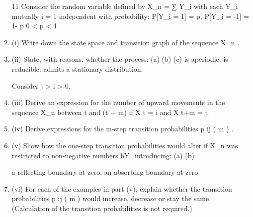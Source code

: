 \documentclass[a4paper,12pt]{article}
\begin{document}
\begin{enumerate}


11
Consider the random variable defined by X_n =
∑ Y_i with each Y_i mutually
i = 1
independent with probability:
P[Y_i = 1] = p, P[Y_i = -1] = 1- p
0 < p < 1
\item (i) Write down the state space and transition graph of the sequence X_n .
\item (ii) State, with reasons, whether the process:
(a)
(b)
(c)
is aperiodic.
is reducible.
admits a stationary distribution.


Consider j > i > 0.
\item (iii) Derive an expression for the number of upward movements in the sequence X_n
between t and (t + m) if X t = i and X t+m = j.

\item (iv) Derive expressions for the m-step transition probabilities p ij ( m ) .
\item (v) Show how the one-step transition probabilities would alter if X_n was restricted
to non-negative numbers bY_introducing:
(a)
(b)

a reflecting boundary at zero.
an absorbing boundary at zero.

\item (vi)
For each of the examples in part (v), explain whether the transition
probabilities p ij ( m ) would increase, decrease or stay the same.
(Calculation of the transition probabilities is not required.)
\end{enumerate}
\newpage 
\end{document}
